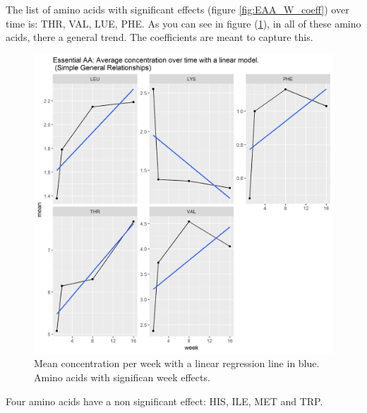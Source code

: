 \documentclass[12pt]{article}
\begin{document}
The list of amino acids with significant effects (figure \ref{fig:EAA_W_coeff}) over time is: THR, VAL, LUE, PHE. As you can see in figure (\ref{fig:EAA_simple}), in all of these amino acids, there a general trend. The coefficients are meant to capture this. 

\begin{figure}[ht]
  \includegraphics[width= \textwidth]{../week/EAA_simple.png}
  \caption{Mean concentration per week with a linear regression line in blue. Amino acids with significan week effects.}
  \label{fig:EAA_simple}
\end{figure}


Four amino acids have a non significant effect: HIS, ILE, MET and TRP.






%
%

%
%




\end{document}
